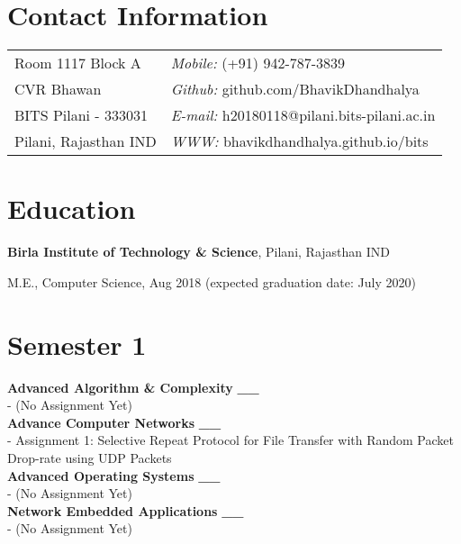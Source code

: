 \documentclass[margin,line]{res}
\newenvironment{list1}{
  \begin{list}{\ding{113}}{%
      \setlength{\itemsep}{0in}
      \setlength{\parsep}{0in} \setlength{\parskip}{0in}
      \setlength{\topsep}{0in} \setlength{\partopsep}{0in} 
      \setlength{\leftmargin}{0.17in}}}{\end{list}}
\begin{document}

\begin{resume}
\section{\sc Contact Information}
\vspace{.05in}
\begin{tabular}{@{}p{2in}p{4in}}
Room 1117 Block A             & {\it Mobile:}  (+91) 942-787-3839 \\            
CVR Bhawan   & {\it Github:}    github.com/BhavikDhandhalya \\         
BITS Pilani - 333031 & {\it E-mail:}  h20180118@pilani.bits-pilani.ac.in\\
Pilani, Rajasthan IND  & {\it WWW:} bhavikdhandhalya.github.io/bits \\     
\end{tabular}



\section{\sc Education}
{\bf Birla Institute of Technology \& Science}, Pilani, Rajasthan IND\\
\vspace*{-.1in}
\begin{list1}
\item[] M.E., Computer Science, Aug 2018 (expected
  graduation date: July 2020)
\vspace*{.05in}
\end{list1}


\section{\sc Semester 1}
{\bf Advanced Algorithm \& Complexity}
\hfill {\bf \_\_}\\
- (No Assignment Yet)\\

{\bf Advance Computer Networks}
\hfill {\bf \_\_}\\
- Assignment 1: Selective Repeat Protocol for File Transfer with Random Packet Drop-rate using UDP
Packets \\

{\bf Advanced Operating Systems}
\hfill {\bf \_\_}\\
- (No Assignment Yet)\\

{\bf Network Embedded Applications}
\hfill {\bf \_\_}\\
- (No Assignment Yet)\\




\end{resume}
\end{document}
